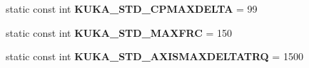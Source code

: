 \begin{DoxyCompactItemize}
\item 
static const int {\bfseries K\+U\+K\+A\+\_\+\+S\+T\+D\+\_\+\+C\+P\+M\+A\+X\+D\+E\+L\+TA} = 99\hypertarget{classkukadu_1_1KukieControlQueue_a577315c7175a12e319629f76656453be}{}\label{classkukadu_1_1KukieControlQueue_a577315c7175a12e319629f76656453be}

\item 
static const int {\bfseries K\+U\+K\+A\+\_\+\+S\+T\+D\+\_\+\+M\+A\+X\+F\+RC} = 150\hypertarget{classkukadu_1_1KukieControlQueue_a5c3b712e15681efe8138f82b964ab28b}{}\label{classkukadu_1_1KukieControlQueue_a5c3b712e15681efe8138f82b964ab28b}

\item 
static const int {\bfseries K\+U\+K\+A\+\_\+\+S\+T\+D\+\_\+\+A\+X\+I\+S\+M\+A\+X\+D\+E\+L\+T\+A\+T\+RQ} = 1500\hypertarget{classkukadu_1_1KukieControlQueue_a074a69b7801bf71d3008187f0455c2f7}{}\label{classkukadu_1_1KukieControlQueue_a074a69b7801bf71d3008187f0455c2f7}

\end{DoxyCompactItemize}

